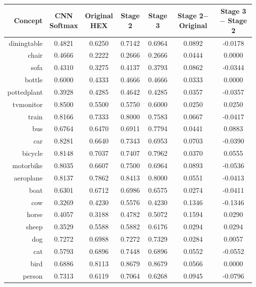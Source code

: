 \documentclass[11pt,a4paper]{article}
\begin{document}
\begin{table}[htbp]
\centering
\begin{tabular}{r|c|c|c|c|c|c}
Concept & \makecell{CNN\\Softmax} & \makecell{Original\\HEX} & Stage 2 & Stage 3 & \makecell{Stage 2$-$\\Original} & \makecell{Stage 3$-$\\Stage 2}\\\hline
diningtable   & 0.4821 & 0.6250 & 0.7142 & 0.6964 & 0.0892 & -0.0178\\
chair         & 0.4666 & 0.2222 & 0.2666 & 0.2666 & 0.0444 & 0.0000\\
sofa          & 0.4310 & 0.3275 & 0.4137 & 0.3793 & 0.0862 & -0.0344\\
bottle        & 0.6000 & 0.4333 & 0.4666 & 0.4666 & 0.0333 & 0.0000\\
pottedplant   & 0.3928 & 0.4285 & 0.4642 & 0.4285 & 0.0357 & -0.0357\\
tvmonitor     & 0.8500 & 0.5500 & 0.5750 & 0.6000 & 0.0250 & 0.0250\\
train         & 0.8166 & 0.7333 & 0.8000 & 0.7583 & 0.0667 & -0.0417\\
bus           & 0.6764 & 0.6470 & 0.6911 & 0.7794 & 0.0441 & 0.0883\\
car           & 0.8281 & 0.6640 & 0.7343 & 0.6953 & 0.0703 & -0.0390\\
bicycle       & 0.8148 & 0.7037 & 0.7407 & 0.7962 & 0.0370 & 0.0555\\
motorbike     & 0.8035 & 0.6607 & 0.7500 & 0.6964 & 0.0893 & -0.0536\\
aeroplane     & 0.8137 & 0.7862 & 0.8413 & 0.8000 & 0.0551 & -0.0413\\
boat          & 0.6301 & 0.6712 & 0.6986 & 0.6575 & 0.0274 & -0.0411\\
cow           & 0.3269 & 0.4230 & 0.5576 & 0.4230 & 0.1346 & -0.1346\\
horse         & 0.4057 & 0.3188 & 0.4782 & 0.5072 & 0.1594 & 0.0290\\
sheep         & 0.3529 & 0.5588 & 0.5882 & 0.6176 & 0.0294 & 0.0294\\
dog           & 0.7272 & 0.6988 & 0.7272 & 0.7329 & 0.0284 & 0.0057\\
cat           & 0.5793 & 0.6896 & 0.7448 & 0.6896 & 0.0552 & -0.0552\\
bird          & 0.6886 & 0.8113 & 0.8679 & 0.8679 & 0.0566 & 0.0000\\
person        & 0.7313 & 0.6119 & 0.7064 & 0.6268 & 0.0945 & -0.0796\\\hline

\end{tabular}
\end{table}
\end{document}

